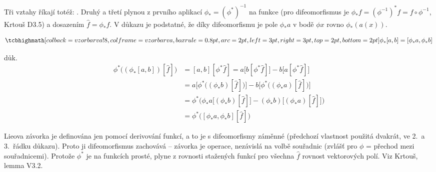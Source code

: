 \begin{vysvetleni}
Tři vztahy říkají totéž: . Druhý a třetí plynou z prvního aplikací $\phi_*=(\phi^*)^{-1}$ na funkce (pro difeomorfismus je $\phi_*f=(\phi^{-1})^*f=f\circ\phi^{-1}$, Krtouš D3.5) a dosazením $\hat f=\phi_*f$. V důkazu je podstatné, že díky difeomorfismu je pole $\phi_*a$ v bodě $\phi x$ rovno $\phi_*(a(x))$.
\end{vysvetleni}

\begin{veta}
\[
  \vzorec{\phi_*[a,b] = [\phi_*a, \phi_*b]}
\]
\end{veta}
důk.
\begin{align*}
  \phi^*\big((\phi_*[a,b])[\hat f]\big) &= [a,b][\phi^*\hat f] = a\big[b[\phi^*\hat f]\big] - b\big[a[\phi^*\hat f]\big] \\
  &= a\big[\phi^*\big((\phi_*b)[\hat f]\big)\big] - b\big[\phi^*\big((\phi_*a)[\hat f]\big)\big] \\
  &= \phi^*\big(\phi_*a\big[(\phi_*b)[\hat f]\big] - (\phi_*b)\big[(\phi_*a)[\hat f]\big]\big) \\
  &= \phi^*\big([\phi_*a, \phi_*b][\hat f]\big)
\end{align*}

\begin{vysvetleni}
Lieova závorka je definována jen pomocí derivování funkcí, a to je s difeomorfismy záměnné (předchozí vlastnost použitá dvakrát, ve 2.\ a 3.\ řádku důkazu). Proto ji difeomorfismus zachovává -- závorka je  operace, nezávislá na volbě souřadnic (zvlášť pro $\phi$ = přechod mezi souřadnicemi). Protože $\phi^*$ je na funkcích prosté, plyne z rovnosti stažených funkcí pro všechna $\hat f$ rovnost vektorových polí. Viz Krtouš, lemma V3.2.
\end{vysvetleni}
